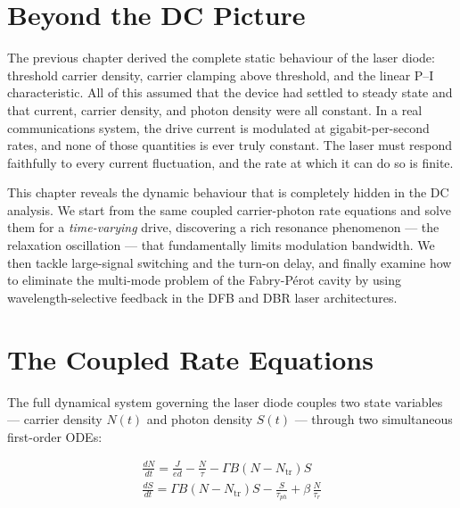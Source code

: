 
\section{Beyond the DC Picture}

The previous chapter derived the complete static behaviour of the laser diode: threshold carrier density, carrier clamping above threshold, and the linear P--I characteristic. All of this assumed that the device had settled to steady state and that current, carrier density, and photon density were all constant. In a real communications system, the drive current is modulated at gigabit-per-second rates, and none of those quantities is ever truly constant. The laser must respond faithfully to every current fluctuation, and the rate at which it can do so is finite.

This chapter reveals the dynamic behaviour that is completely hidden in the DC analysis. We start from the same coupled carrier-photon rate equations and solve them for a \emph{time-varying} drive, discovering a rich resonance phenomenon — the relaxation oscillation — that fundamentally limits modulation bandwidth. We then tackle large-signal switching and the turn-on delay, and finally examine how to eliminate the multi-mode problem of the Fabry-Pérot cavity by using wavelength-selective feedback in the DFB and DBR laser architectures.

\section{The Coupled Rate Equations}

The full dynamical system governing the laser diode couples two state variables — carrier density $N(t)$ and photon density $S(t)$ — through two simultaneous first-order ODEs:
\begin{keyresult}
    \begin{gather}
        \frac{dN}{dt} = \frac{J}{ed} - \frac{N}{\tau} - \Gamma B(N - N_\text{tr})S \\[6pt]
        \frac{dS}{dt} = \Gamma B(N - N_\text{tr})S - \frac{S}{\tau_{ph}} + \beta\,\frac{N}{\tau_r}
    \end{gather}
\end{keyresult}

